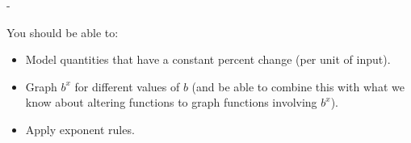 \documentclass{article}
\makeatletter
\newlength{\tipmargin}
\renewenvironment{framed}{
  \setlength{\tipmargin}{\textwidth-\linewidth}
  \advance\@totalleftmargin-\tipmargin
  \def\FrameCommand{\hspace{\tipmargin}\fbox}%
  \advance\linewidth\tipmargin
  \MakeFramed {\advance\hsize-\width \FrameRestore}%
}
{\endMakeFramed}
\makeatother
\begin{document}

\begin{problemonly}
  \begin{framed}

You should be able to:
    \begin{itemize}[topsep=0pt,partopsep=0pt,parsep=8pt,itemsep=0pt]
    \item Model quantities that have a constant percent change (per unit of input). 

    \item Graph $b^x$ for different values of $b$ (and be able to combine this with what we know about altering functions to graph functions involving $b^x$).

    \item Apply exponent rules. 
    \end{itemize}
  \end{framed}
\end{problemonly}
\end{document}

